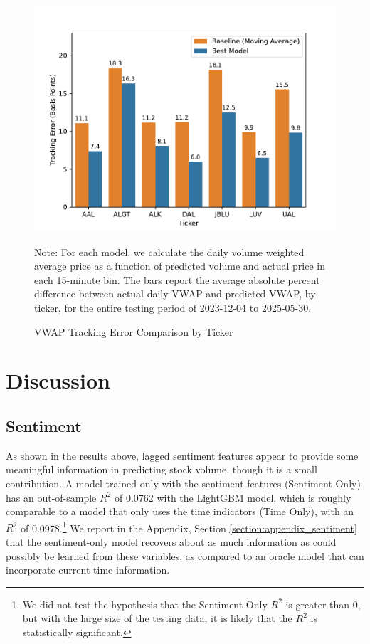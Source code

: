 \documentclass[12pt]{article}
\begin{document}
\begin{figure}[H]
    \centering
    \caption{VWAP Tracking Error Comparison by Ticker}
    \includegraphics[width=0.85\linewidth]{../Output/vwap_compare.pdf}
    \begin{minipage}{0.8\linewidth}
        \footnotesize
        \singlespacing
        Note: For each model, we calculate the daily volume weighted average price as a function of predicted volume and actual price in each 15-minute bin. The bars report the average absolute percent difference between actual daily VWAP and predicted VWAP, by ticker, for the entire testing period of 2023-12-04 to 2025-05-30.
    \end{minipage}
    \label{fig:vwap_tracking_error}
\end{figure}

\newpage
\section{Discussion}
\label{section:discussion}
\subsection{Sentiment}
As shown in the results above, lagged sentiment features appear to provide some meaningful information in predicting stock volume, though it is a small contribution. A model trained only with the sentiment features (Sentiment Only) has an out-of-sample $R^2$ of 0.0762 with the LightGBM model, which is roughly comparable to a model that only uses the time indicators (Time Only), with an $R^2$ of 0.0978.\footnote{We did not test the hypothesis that the Sentiment Only $R^2$ is greater than 0, but with the large size of the testing data, it is likely that the $R^2$ is statistically significant.} We report in the Appendix, Section \ref{section:appendix_sentiment} that the sentiment-only model recovers about as much information as could possibly be learned from these variables, as compared to an oracle model that can incorporate current-time information.
\end{document}
